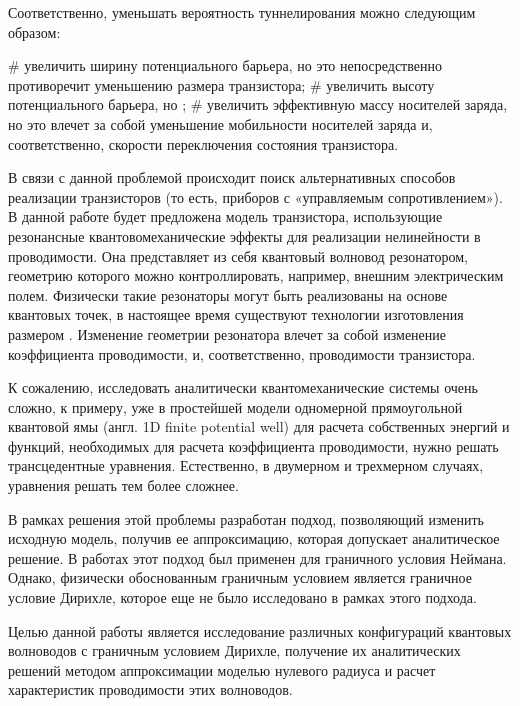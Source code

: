 Соответственно, уменьшать вероятность туннелирования можно следующим образом:

\begin{easylist}[itemize]
# увеличить ширину потенциального барьера, но это непосредственно противоречит уменьшению размера транзистора;
# увеличить высоту потенциального барьера, но ;
# увеличить эффективную массу носителей заряда, но это влечет за собой уменьшение мобильности носителей заряда и, соответственно, скорости переключения состояния транзистора.
\end{easylist}

В связи с данной проблемой происходит поиск альтернативных способов реализации транзисторов (то есть, приборов с «управляемым сопротивлением»). В данной работе будет предложена модель транзистора, использующие резонансные квантовомеханические эффекты для реализации нелинейности в проводимости. Она представляет из себя квантовый волновод резонатором, геометрию которого можно контроллировать, например, внешним электрическим полем. Физически такие резонаторы могут быть реализованы на основе квантовых точек, в настоящее время существуют технологии изготовления размером . Изменение геометрии резонатора влечет за собой изменение коэффициента проводимости, и, соответственно, проводимости транзистора.

К сожалению, исследовать аналитически квантомеханические системы очень сложно, к примеру, уже в простейшей модели одномерной прямоугольной квантовой ямы (англ. 1D finite potential well) для расчета собственных энергий и функций, необходимых для расчета коэффициента проводимости, нужно решать трансцедентные уравнения. Естественно, в двумерном и трехмерном случаях, уравнения решать тем более сложнее.

В рамках решения этой проблемы разработан подход, позволяющий изменить исходную модель, получив ее аппроксимацию, которая допускает аналитическое решение. В работах  этот подход был применен для граничного условия Неймана. Однако, физически обоснованным граничным условием является граничное условие Дирихле, которое еще не было исследовано в рамках этого подхода.

Целью данной работы является исследование различных конфигураций квантовых волноводов с граничным условием Дирихле, получение их аналитических решений методом аппроксимации моделью нулевого радиуса и расчет характеристик проводимости этих волноводов.